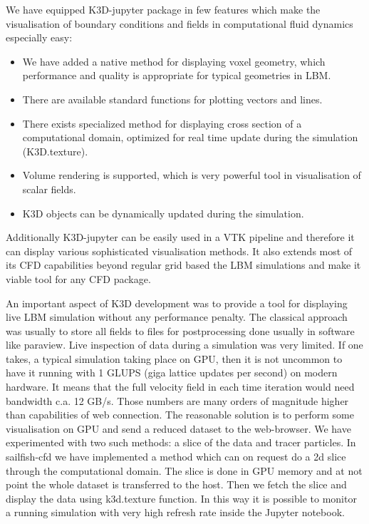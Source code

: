 \documentclass{deliverablereport}
\begin{document}
We have equipped K3D-jupyter package in few features which make the
visualisation of boundary conditions and fields in computational
fluid dynamics especially easy:

\begin{itemize}
\item We have added a native method for displaying voxel geometry,
  which performance and quality is appropriate for typical geometries
  in LBM.
\item There are available standard functions for plotting vectors and lines.
\item There exists specialized method for displaying cross section of
  a computational domain, optimized for real time update during the
  simulation (K3D.texture).
\item Volume rendering is supported, which is very powerful tool in
  visualisation of scalar fields.
\item K3D objects can be dynamically updated during the simulation.
\end{itemize}

Additionally K3D-jupyter can be easily used in a VTK pipeline and
therefore it can display various sophisticated visualisation
methods. It also extends most of its CFD capabilities beyond regular
grid based the LBM simulations and make it viable tool for any CFD
package.

An important aspect of K3D development was to provide a tool for
displaying live LBM simulation without any performance penalty. The
classical approach was usually to store all fields to files for
postprocessing done usually in software like paraview. Live inspection
of data during a simulation was very limited.  If one takes, a typical
simulation taking place on GPU, then it is not uncommon to have it
running with 1 GLUPS (giga lattice updates per second) on modern
hardware. It means that the full velocity field in each time iteration
would need bandwidth c.a. 12 GB/s. Those numbers are many orders of
magnitude higher than capabilities of web connection.  The reasonable
solution is to perform some visualisation on GPU and send a reduced
dataset to the web-browser. We have experimented with two such
methods: a slice of the data and tracer particles. In sailfish-cfd we
have implemented a method which can on request do a 2d slice through
the computational domain. The slice is done in GPU memory and at not
point the whole dataset is transferred to the host. Then we fetch the
slice and display the data using k3d.texture function. In this way it
is possible to monitor a running simulation with very high refresh
rate inside the Jupyter notebook. 
\end{document}
